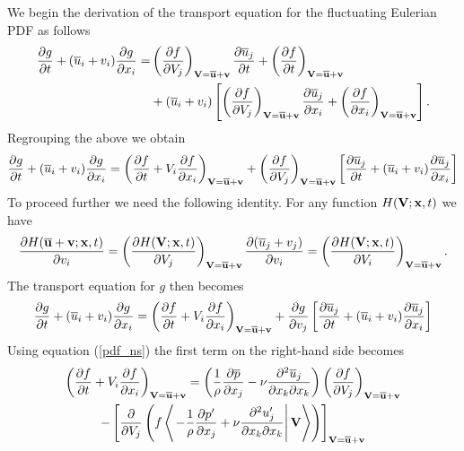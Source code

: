 \documentclass[oneside,a4paper,11pt]{report}
\newcommand{\pavg}{\overline{p}}
\newcommand{\uavg}{\overline{u}}
\newcommand{\pfluc}{p'}
\newcommand{\ufluc}{u'}
\begin{document}
We begin the derivation of the transport equation for the fluctuating Eulerian PDF as follows 
\begin{align}
\frac{\partial g}{\partial t} + ( \uavg_i + v_i ) \frac{\partial g}{\partial x_i} = & \left ( \frac{\partial f}{\partial V_j} \right )_{\Vvec = \overline{\uvec} + \vvec} \frac{\partial \uavg_j}{\partial t} + \left (\frac{\partial f}{\partial t} \right )_{\Vvec = \overline{\uvec} + \vvec} \nonumber \\
&+ ( \uavg_i + v_i ) \left [ \left ( \frac{\partial f}{\partial V_j} \right )_{\Vvec = \overline{\uvec} + \vvec} \frac{\partial \uavg_j}{\partial x_i} + \left (\frac{\partial f}{\partial x_i} \right )_{\Vvec = \overline{\uvec} + \vvec} \right ].
\end{align}
Regrouping the above we obtain
\begin{equation}
\frac{\partial g}{\partial t} + ( \uavg_i + v_i ) \frac{\partial g}{\partial x_i} = \left ( \frac{\partial f}{\partial t} + V_i \frac{\partial f}{\partial x_i} \right )_{\Vvec = \overline{\uvec} + \vvec} + \left ( \frac{\partial f}{\partial V_j} \right )_{\Vvec = \overline{\uvec} + \vvec} \left [ \frac{\partial \uavg_j}{\partial t} + (\uavg_i + v_i) \frac{\partial \uavg_j}{\partial x_i} \right ]
\end{equation}
To proceed further we need the following identity. For any function $H(\mathbf{V}; \mathbf{x}, t)$ we have
\begin{equation}
\label{deriv_v}
\frac{\partial H(\overline{\uvec} + \vvec; \xvec, t)}{\partial v_i} = \left ( \frac{\partial H(\Vvec; \xvec, t)}{\partial V_j} \right )_{\Vvec = \overline{\uvec} + \vvec} \frac{\partial ( \uavg_j + v_j) }{\partial v_i} = \left ( \frac{\partial H(\Vvec; \xvec,t )}{\partial V_i} \right )_{\Vvec = \overline{\uvec} + \vvec}.
\end{equation}
The transport equation for $g$ then becomes
\begin{equation}
\frac{\partial g}{\partial t} + ( \uavg_i + v_i ) \frac{\partial g}{\partial x_i} = \left ( \frac{\partial f}{\partial t} + V_i \frac{\partial f}{\partial x_i} \right )_{\Vvec = \overline{\uvec} + \vvec} + \frac{\partial g}{\partial v_j} \left [ \frac{\partial \uavg_j}{\partial t} + (\uavg_i + v_i) \frac{\partial \uavg_j}{\partial x_i} \right ]
\end{equation}
Using equation (\ref{pdf_ns}) the first term on the right-hand side becomes
\begin{multline}
\left ( \frac{\partial f}{\partial t} + V_i \frac{\partial f}{\partial x_i} \right )_{\Vvec = \overline{\uvec} + \vvec} = \left ( \frac{1}{\rho} \frac{\partial \pavg}{\partial x_j} -\nu \frac{\partial^2 \uavg_j}{\partial x_k \partial x_k} \right ) \left (\frac{\partial f}{\partial V_j} \right )_{\Vvec = \overline{\uvec} + \vvec} \\
- \left [ \frac{\partial}{\partial V_j} \left ( f \left < \left . - \frac{1}{\rho} \frac{\partial \pfluc}{\partial x_j} +  \nu \frac{\partial ^2 \ufluc_j}{\partial x_k \partial x_k} \right | \Vvec \right > \right ) \right ]_{\Vvec = \overline{\uvec} + \vvec} 
\end{multline}
\end{document}
